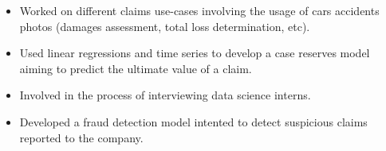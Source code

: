 \documentclass[10pt,a4paper,ragged2e]{altacv}
\begin{document}

\begin{fullwidth}
\makecvheader
\end{fullwidth}



\begin{itemize}
\item Worked on different claims use-cases involving the usage of cars accidents photos (damages assessment, total loss determination, etc).
\item Used linear regressions and time series to develop a case reserves model aiming to predict the ultimate value of a claim.
\item Involved in the process of interviewing data science interns.
\end{itemize}

\smallskip

\begin{itemize}
\item Developed a fraud detection model intented to detect suspicious claims reported to the company.
\end{itemize}
\end{document}
